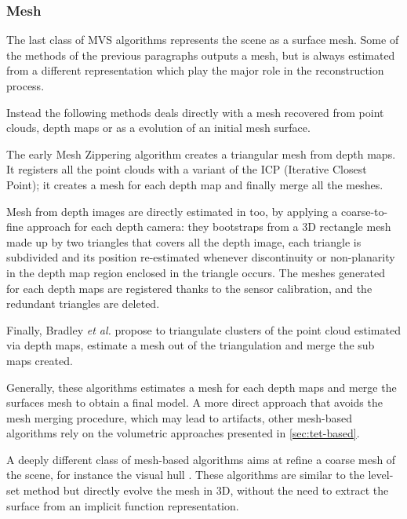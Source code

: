 \subsubsection{Mesh}

The last class of MVS algorithms represents the scene as a surface mesh. Some of the methods of the previous paragraphs outputs a mesh, but is always estimated from a different representation which play the major role in the reconstruction process.

Instead the following methods deals directly with a mesh recovered from point clouds, depth maps or as a evolution of an initial mesh surface.

The early Mesh Zippering algorithm \cite{turk1994zippered} creates a triangular mesh from depth maps. It registers all the point clouds with a variant of the ICP (Iterative Closest Point); it creates a mesh for each depth map and finally merge all the meshes.

Mesh from depth images are directly estimated in \cite{pollefeys_et_al_08} too, by applying a coarse-to-fine approach for each depth camera: they bootstraps from a 3D rectangle mesh made up by two triangles that covers all the depth image, each triangle is subdivided and its position re-estimated whenever discontinuity or non-planarity in the depth map region enclosed in the triangle occurs. The meshes generated for each depth maps are registered thanks to the sensor calibration, and the redundant triangles are deleted.

Finally, Bradley \emph{et al.} \cite{bradley2008accurate} propose to triangulate clusters of the point cloud estimated via depth maps, estimate a mesh out of the triangulation and merge the sub maps created.

Generally, these algorithms estimates a mesh for each depth maps and merge the surfaces mesh to obtain a final model.
A more direct approach that avoids the mesh merging procedure, which may lead to artifacts, other mesh-based algorithms rely on the volumetric approaches presented in \ref{sec:tet-based}.

A deeply different class of mesh-based algorithms aims at refine a coarse mesh of the scene, for instance the visual hull \cite{hiep2009towards,zaharescu2007transformesh,delaunoy_et_al_08,gargallo2007minimizing,delaunoy2011gradient,vu2011large}. These algorithms are similar to the level-set method but directly evolve the mesh in 3D, without the need to extract the surface from an implicit function representation.

